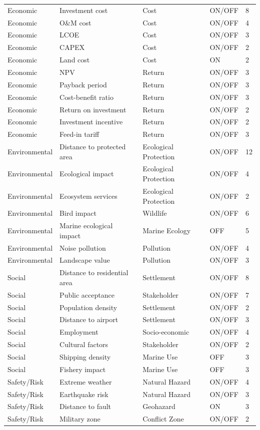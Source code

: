 \documentclass[12pt,a4paper]{article}
\begin{document}
\begin{center}
\begin{longtable}{p{2.1cm}p{3.5cm}p{2.0cm}p{2.0cm}p{1.2cm}}
Economic & Investment cost & Cost & ON/OFF & 8 \\
Economic & O\&M cost & Cost & ON/OFF & 4 \\
Economic & LCOE & Cost & ON/OFF & 3 \\
Economic & CAPEX & Cost & ON/OFF & 2 \\
Economic & Land cost & Cost & ON & 2 \\
Economic & NPV & Return & ON/OFF & 3 \\
Economic & Payback period & Return & ON/OFF & 3 \\
Economic & Cost-benefit ratio & Return & ON/OFF & 3 \\
Economic & Return on investment & Return & ON/OFF & 2 \\
Economic & Investment incentive & Return & ON/OFF & 2 \\
Economic & Feed-in tariff & Return & ON/OFF & 3 \\
Environmental & Distance to protected area & Ecological Protection & ON/OFF & 12 \\
Environmental & Ecological impact & Ecological Protection & ON/OFF & 4 \\
Environmental & Ecosystem services & Ecological Protection & ON/OFF & 2 \\
Environmental & Bird impact & Wildlife & ON/OFF & 6 \\
Environmental & Marine ecological impact & Marine Ecology & OFF & 5 \\
Environmental & Noise pollution & Pollution & ON/OFF & 4 \\
Environmental & Landscape value & Pollution & ON/OFF & 3 \\
Social & Distance to residential area & Settlement & ON/OFF & 8 \\
Social & Public acceptance & Stakeholder & ON/OFF & 7 \\
Social & Population density & Settlement & ON/OFF & 2 \\
Social & Distance to airport & Settlement & ON/OFF & 3 \\
Social & Employment & Socio-economic & ON/OFF & 4 \\
Social & Cultural factors & Stakeholder & ON/OFF & 2 \\
Social & Shipping density & Marine Use & OFF & 3 \\
Social & Fishery impact & Marine Use & OFF & 3 \\
Safety/Risk & Extreme weather & Natural Hazard & ON/OFF & 4 \\
Safety/Risk & Earthquake risk & Natural Hazard & ON/OFF & 3 \\
Safety/Risk & Distance to fault & Geohazard & ON & 3 \\
Safety/Risk & Military zone & Conflict Zone & ON/OFF & 2 \\
\end{longtable}
\end{center}
\end{document}
